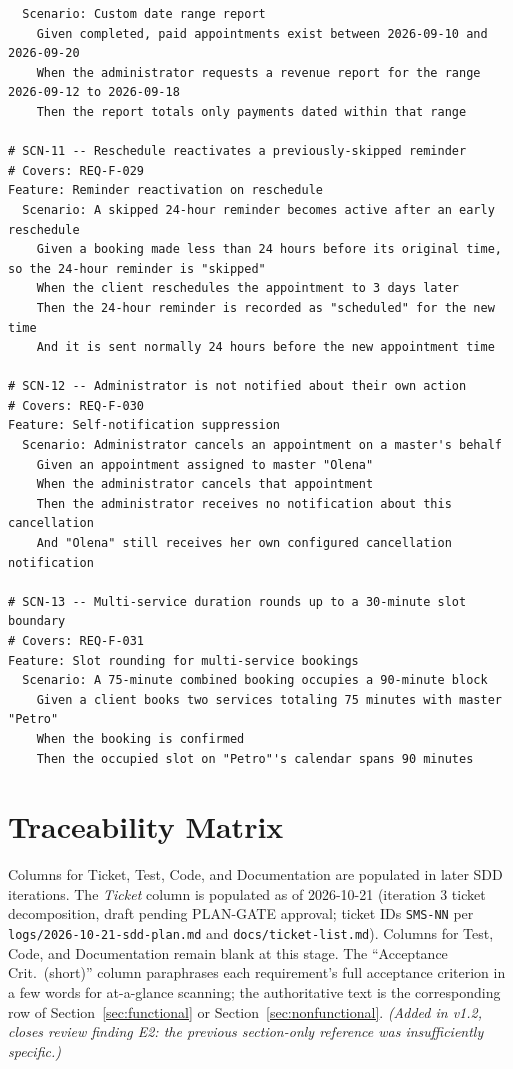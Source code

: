 \documentclass[11pt,a4paper]{article}
\begin{document}
\begin{lstlisting}
  Scenario: Custom date range report
    Given completed, paid appointments exist between 2026-09-10 and 2026-09-20
    When the administrator requests a revenue report for the range 2026-09-12 to 2026-09-18
    Then the report totals only payments dated within that range

# SCN-11 -- Reschedule reactivates a previously-skipped reminder
# Covers: REQ-F-029
Feature: Reminder reactivation on reschedule
  Scenario: A skipped 24-hour reminder becomes active after an early reschedule
    Given a booking made less than 24 hours before its original time, so the 24-hour reminder is "skipped"
    When the client reschedules the appointment to 3 days later
    Then the 24-hour reminder is recorded as "scheduled" for the new time
    And it is sent normally 24 hours before the new appointment time

# SCN-12 -- Administrator is not notified about their own action
# Covers: REQ-F-030
Feature: Self-notification suppression
  Scenario: Administrator cancels an appointment on a master's behalf
    Given an appointment assigned to master "Olena"
    When the administrator cancels that appointment
    Then the administrator receives no notification about this cancellation
    And "Olena" still receives her own configured cancellation notification

# SCN-13 -- Multi-service duration rounds up to a 30-minute slot boundary
# Covers: REQ-F-031
Feature: Slot rounding for multi-service bookings
  Scenario: A 75-minute combined booking occupies a 90-minute block
    Given a client books two services totaling 75 minutes with master "Petro"
    When the booking is confirmed
    Then the occupied slot on "Petro"'s calendar spans 90 minutes
\end{lstlisting}

\section{Traceability Matrix}
\label{sec:traceability}

Columns for Ticket, Test, Code, and Documentation are populated in later SDD
iterations. The \emph{Ticket} column is populated as of 2026-10-21 (iteration 3
ticket decomposition, draft pending PLAN-GATE approval; ticket IDs
\texttt{SMS-NN} per \texttt{logs/2026-10-21-sdd-plan.md} and
\texttt{docs/ticket-list.md}). Columns for Test, Code, and
Documentation remain blank at this stage. The
``Acceptance Crit.\ (short)'' column paraphrases each requirement's full
acceptance criterion in a few words for at-a-glance scanning; the
authoritative text is the corresponding row of Section~\ref{sec:functional}
or Section~\ref{sec:nonfunctional}. \emph{(Added in v1.2, closes review
finding E2: the previous section-only reference was insufficiently
specific.)}
\end{document}

